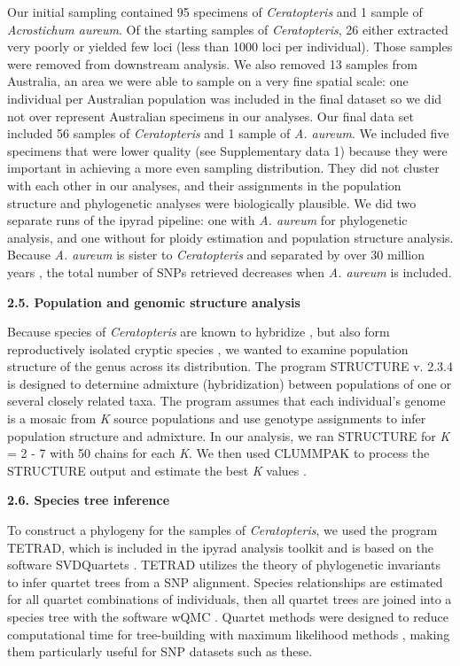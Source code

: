 \documentclass[12pt]{article}
\begin{document}
\begin{flushleft}
Our initial sampling contained 95 specimens of \textit{Ceratopteris} and 1 sample of \textit{Acrostichum aureum}. Of the starting samples of \textit{Ceratopteris}, 26 either extracted very poorly or yielded few loci (less than 1000 loci per individual). Those samples were removed from downstream analysis. We also removed 13 samples from Australia, an area we were able to sample on a very fine spatial scale: one individual per Australian population was included in the final dataset so we did not over represent Australian specimens in our analyses. Our final data set included 56 samples of \textit{Ceratopteris} and 1 sample of \textit{A. aureum}. We included five specimens that were lower quality (see Supplementary data 1) because they were important in achieving a more even sampling distribution. They did not cluster with each other in our analyses, and their assignments in the population structure and phylogenetic analyses were biologically plausible. We did two separate runs of the ipyrad pipeline: one with \textit{A. aureum} for phylogenetic analysis, and one without for ploidy estimation and population structure analysis. Because \textit{A. aureum} is sister to \textit{Ceratopteris} and separated by over 30 million years \autocite{PPGI}, the total number of SNPs retrieved decreases when \textit{A. aureum} is included.

\textbf{2.5. Population and genomic structure analysis}

Because species of \textit{Ceratopteris} are known to hybridize \autocite{hickok1974}, but also form reproductively isolated cryptic species \autocite{Masuyama2002}, we wanted to examine population structure of the genus across its distribution. The program {\small{STRUCTURE}} v. 2.3.4 \autocite{Pritchard2000} is designed to determine admixture (hybridization) between populations of one or several closely related taxa. The program assumes that each individual's genome is a mosaic from \textit{K} source populations and use genotype assignments to infer population structure and admixture. In our analysis, we ran {\small{STRUCTURE}} for \textit{K} = 2 - 7 with 50 chains for each \textit{K}. We then used {\small{CLUMMPAK}} \autocite{Kopelman2015} to process the {\small{STRUCTURE}} output and estimate the best \textit{K} values \autocite{Evanno2005, Pritchard2000}.

\textbf{2.6. Species tree inference}

To construct a phylogeny for the samples of \textit{Ceratopteris}, we used the program {\small{TETRAD}}, which is included in the ipyrad analysis toolkit and is based on the software \small{SVDQuartets} \autocite{Chifman2015}. {\small{TETRAD}} utilizes the theory of phylogenetic invariants to infer quartet trees from a SNP alignment. Species relationships are estimated for all quartet combinations of individuals, then all quartet trees are joined into a species tree with the software {\small{wQMC}} \autocite{Avni2015}. Quartet methods were designed to reduce computational time for tree-building with maximum likelihood methods \autocite{Ranwez2001}, making them particularly useful for SNP datasets such as these.


\end{flushleft}
\end{document}
